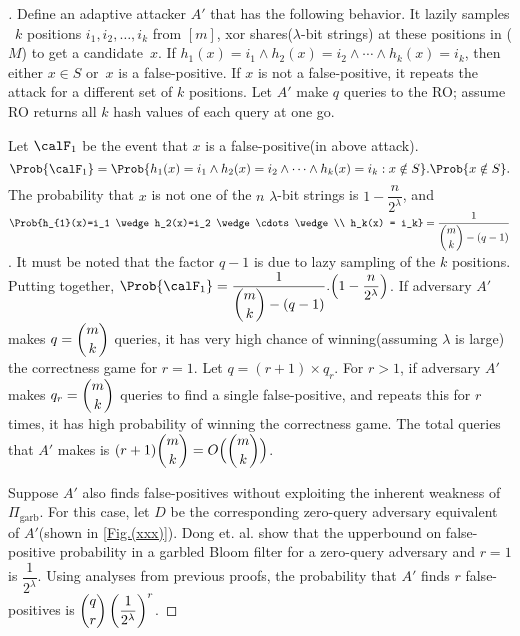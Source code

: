 \begin{proof}[]
Define an adaptive attacker $A'$ that has the following behavior. It lazily samples ~$k$ positions $i_1,i_2,\ldots,i_k$ from $[m]$, xor shares($\lambda$-bit strings) at these positions in ($M$) to get a candidate~$x$.  If $h_{1}(x)=i_1 \wedge h_2(x)=i_2 \wedge \cdots \wedge h_k(x) = i_k$, then either $x \in S$ or~$x$ is a false-positive. If $x$ is not a false-positive, it repeats the attack for a different set of $k$ positions. Let $A'$ make $q$ queries to the RO; assume RO returns all $k$ hash values of each query at one go.

Let $\calF_1$ be the event that $x$ is a false-positive(in above attack).
 $$\Prob{\calF_1} = \Prob{h_{1}(x)=i_1 \wedge h_2(x)=i_2 \wedge \cdots \wedge h_k(x) = i_k : x \notin S}.\Prob{x \notin S}.$$
 The probability that $x$ is not one of the $n$ $\lambda$-bit strings is $1-\dfrac{n}{2^\lambda}$, and $ \Prob{h_{1}(x)=i_1 \wedge h_2(x)=i_2 \wedge \cdots \wedge\\ h_k(x) = i_k} = \dfrac{1}{\dbinom{m}{k}-(q-1)}$. It must be noted that the factor $q-1$ is due to lazy sampling of the $k$ positions. Putting together, $\Prob{\calF_1} =  \dfrac{1}{\dbinom{m}{k}-(q-1)} . \Big(1-\dfrac{n}{2^\lambda}\Big)$.  If adversary $A'$ makes $q = \dbinom{m}{k}$ queries, it has very high chance of winning(assuming $\lambda$ is large) the correctness game for $r=1$.  Let $q = (r+1) \times q_r$. For $r > 1$, if adversary $A'$ makes $q_r = \dbinom{m}{k}$ queries to find a single false-positive, and repeats this for $r$ times, it has high probability of winning the correctness game. The total queries that $A'$ makes is $(r+1)\dbinom{m}{k} = O\Big(\dbinom{m}{k}\Big)$.

Suppose $A'$ also finds false-positives without exploiting the inherent weakness of $\Pi_{\mathrm{garb}}$. For this case, let $D$ be the corresponding  zero-query adversary equivalent of $A'$(shown in \ref{Fig.(xxx)}). Dong et. al. \cite{dong2013private} show that the upperbound on false-positive probability in a garbled Bloom filter for a zero-query adversary and $r=1$ is $\dfrac{1}{2^\lambda}$.   Using analyses from previous proofs, the probability that $A'$ finds $r$ false-positives is $\dbinom{q}{r}\left(\dfrac{1}{2^\lambda}\right)^r$. 


\end{proof}
